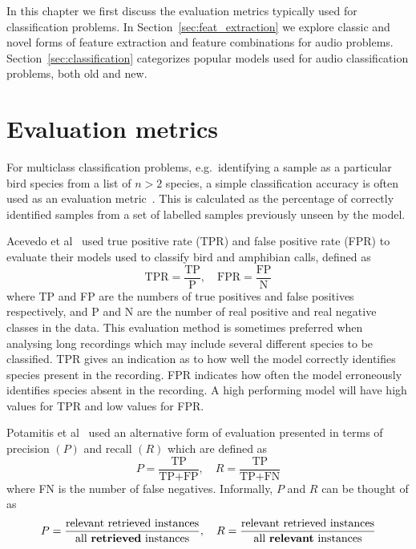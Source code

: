 In this chapter we first discuss the evaluation metrics typically used for
classification problems. In Section~\ref{sec:feat_extraction} we explore classic
and novel forms of feature extraction and feature combinations for audio
problems. Section~\ref{sec:classification} categorizes popular models used for
audio classification problems, both old and new.

\section{Evaluation metrics}\label{sec:eval_metrics}

For multiclass classification problems, e.g.\ identifying a sample as a
particular bird species from a list of $n > 2$ species, a simple classification
accuracy is often used as an evaluation
metric~\cite{chakraborty2016bird,ramashini2022robust}. This is calculated as
the percentage of correctly identified samples from a set of labelled samples
previously unseen by the model.

Acevedo et al~\cite{acevedo2009automated} used true positive rate (TPR) and false
positive rate (FPR) to evaluate their models used to classify bird and amphibian
calls, defined as
\begin{equation}
  \text{TPR} = \frac{\text{TP}}{\text{P}}, \hspace{1em}
  \text{FPR} = \frac{\text{FP}}{\text{N}}
\end{equation}
where TP and FP are the numbers of true positives and false positives
respectively, and P and N are the number of real positive and real negative
classes in the data. This evaluation method is sometimes preferred when
analysing long recordings which may include several different species to be
classified. TPR gives an indication as to how well the model correctly identifies
species present in the recording. FPR indicates how often the model erroneously
identifies species absent in the recording. A high performing model will have
high values for TPR and low values for FPR\@.

Potamitis et al~\cite{potamitis2014automatic} used an alternative form of
evaluation presented in terms of precision $(P)$ and recall $(R)$ which are
defined as
\begin{equation}
  P = \frac{\text{TP}}{\text{TP}+\text{FP}}, \hspace{1em}
  R = \frac{\text{TP}}{\text{TP}+\text{FN}}
\end{equation}
where FN is the number of false negatives. Informally, $P$ and $R$ can be
thought of as
\begin{equation}
  P = \frac{\text{relevant retrieved instances}}{\text{all \textbf{retrieved} instances}}, \hspace{1em}
  R = \frac{\text{relevant retrieved instances}}{\text{all \textbf{relevant} instances}}
\end{equation}

